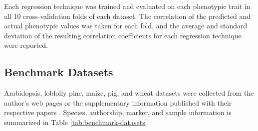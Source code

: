 \documentclass[9pt,twocolumn,twoside]{g3_article/gsag3jnl}
\newcommand{\etal}{\textit{et al.}}
\begin{document}
Each regression technique was trained and evaluated on each phenotypic trait in all 10 cross-validation folds of each dataset.
The correlation of the predicted and actual phenotypic values was taken for each fold, and the average and 
standard deviation of the resulting correlation coefficients for each regression technique were reported.
 

\subsection*{Benchmark Datasets}

Arabidopsis, loblolly pine, maize, pig, and wheat datasets were collected from the author's web pages
or the supplementary information published with their respective papers \citep{loudet2002, resende2012, crossa2010, cleveland2012, thavamanikumar2015}.
Species, authorship, marker, and sample information is summarized in Table \ref{tab:benchmark-datasets}.

\newcommand{\loudet}        {\multirow{2}{3cm}{Loudet \etal ~2002}}
\newcommand{\resende}       {\multirow{2}{3cm}{Resende \etal ~2012}}
\newcommand{\crossa}        {\multirow{2}{3cm}{Crossa \etal ~2010}}
\newcommand{\cleveland}     {\multirow{2}{3cm}{Cleveland \etal ~2012}}
\newcommand{\thavamanikumar}{\multirow{2}{3cm}{Thavamanikumar \etal ~2015}}
\end{document}
